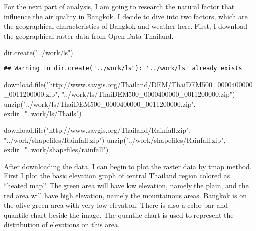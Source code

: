 \documentclass[
]{article}
\newenvironment{Shaded}{\begin{snugshade}}{\end{snugshade}}
\newcommand{\AttributeTok}[1]{\textcolor[rgb]{0.77,0.63,0.00}{#1}}
\newcommand{\FunctionTok}[1]{\textcolor[rgb]{0.00,0.00,0.00}{#1}}
\newcommand{\NormalTok}[1]{#1}
\newcommand{\StringTok}[1]{\textcolor[rgb]{0.31,0.60,0.02}{#1}}
\begin{document}
For the next part of analysis, I am going to research the natural factor
that influence the air quality in Bangkok. I decide to dive into two
factors, which are the geographical characteristics of Bangkok and
weather here. First, I download the geographical raster data from Open
Data Thailand.

\begin{Shaded}
\begin{Highlighting}[]
\FunctionTok{dir.create}\NormalTok{(}\StringTok{"../work/ls"}\NormalTok{)}
\end{Highlighting}
\end{Shaded}

\begin{verbatim}
## Warning in dir.create("../work/ls"): '../work/ls' already exists
\end{verbatim}

\begin{Shaded}
\begin{Highlighting}[]
\FunctionTok{download.file}\NormalTok{(}\StringTok{"http://www.savgis.org/Thailand/DEM/ThaiDEM500\_0000400000\_0011200000.zip"}\NormalTok{,}
              \StringTok{"../work/ls/ThaiDEM500\_0000400000\_0011200000.zip"}\NormalTok{)}
\FunctionTok{unzip}\NormalTok{(}\StringTok{"../work/ls/ThaiDEM500\_0000400000\_0011200000.zip"}\NormalTok{,}
      \AttributeTok{exdir=}\StringTok{"..work/ls/Thails"}\NormalTok{)}

\FunctionTok{download.file}\NormalTok{(}\StringTok{"http://www.savgis.org/Thailand/Rainfall.zip"}\NormalTok{,}
              \StringTok{"../work/shapefiles/Rainfall.zip"}\NormalTok{)}
\FunctionTok{unzip}\NormalTok{(}\StringTok{"../work/shapefiles/Rainfall.zip"}\NormalTok{,}
      \AttributeTok{exdir=}\StringTok{"..work/shapefiles/rainfall"}\NormalTok{)}
\end{Highlighting}
\end{Shaded}

After downloading the data, I can begin to plot the raster data by tmap
method. First I plot the basic elevation graph of central Thailand
region colored as ``heated map''. The green area will have low
elevation, namely the plain, and the red area will have high elevation,
namely the mountainous areas. Bangkok is on the olive green area with
very low elevation. There is also a color bar and quantile chart beside
the image. The quantile chart is used to represent the distribution of
elevations on this area.
\end{document}
